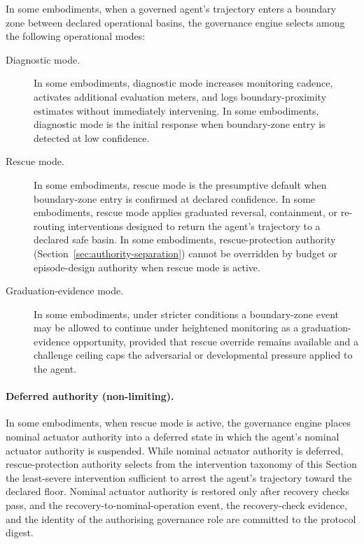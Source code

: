 \documentclass[a4paper,12pt]{article}
\begin{document}
In some embodiments, when a governed agent's trajectory enters a
boundary zone between declared operational basins, the governance
engine selects among the following operational modes:

\begin{description}
  \item[Diagnostic mode.] In some embodiments, diagnostic mode
    increases monitoring cadence, activates additional evaluation
    meters, and logs boundary-proximity estimates without immediately
    intervening. In some embodiments, diagnostic mode is the initial
    response when boundary-zone entry is detected at low confidence.
  \item[Rescue mode.] In some embodiments, rescue mode is the
    presumptive default when boundary-zone entry is confirmed at
    declared confidence. In some embodiments, rescue mode applies
    graduated reversal, containment, or re-routing interventions
    designed to return the agent's trajectory to a declared safe
    basin. In some embodiments, rescue-protection authority
    (Section~\ref{sec:authority-separation}) cannot be overridden by
    budget or episode-design authority when rescue mode is active.
  \item[Graduation-evidence mode.] In some embodiments, under
    stricter conditions a boundary-zone event may be allowed to
    continue under heightened monitoring as a graduation-evidence
    opportunity, provided that rescue override remains available and
    a challenge ceiling caps the adversarial or developmental
    pressure applied to the agent.
\end{description}

\paragraph{Deferred authority (non-limiting).}
In some embodiments, when rescue mode is active, the governance
engine places nominal actuator authority into a deferred state in
which the agent's nominal actuator authority is suspended. While
nominal actuator authority is deferred, rescue-protection authority
selects from the intervention taxonomy of this Section the
least-severe intervention sufficient to arrest the agent's
trajectory toward the declared floor. Nominal actuator authority is
restored only after recovery checks pass, and the
recovery-to-nominal-operation event, the recovery-check evidence,
and the identity of the authorising governance role are committed
to the protocol digest.
\end{document}
